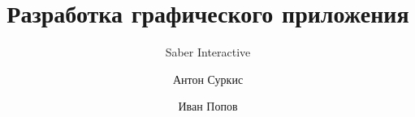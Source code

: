 \documentclass{beamer}
\title{Разработка графического приложения} %
\subtitle{Saber Interactive}
\author{%
    Антон Суркис
    \and
    Иван Попов
}
\begin{document}
    \begin{frame}
        \maketitle
    \end{frame}
    
    
    
    
\end{document}
